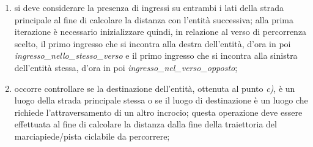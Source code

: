 \begin{enumerate}
\begin{enumerate}
\item si deve considerare la presenza di ingressi su entrambi i lati della strada principale al fine di calcolare la distanza con l'entità successiva; alla prima iterazione è necessario inizializzare quindi, in relazione al verso di percorrenza scelto, il primo ingresso che si incontra alla destra dell'entità, d'ora in poi \textit{ingres\-so\_nel\-lo\_stes\-so\_ver\-so} e il primo ingresso che si incontra alla sinistra dell'entità stessa, d'ora in poi \textit{ingres\-so\_nel\_ver\-so\_op\-pos\-to};   
\item occorre controllare se la destinazione dell'entità, ottenuta al punto \textit{c)}, è un luogo della strada principale stessa o se il luogo di destinazione è un luogo che richiede l'attraversamento di un altro incrocio; questa operazione deve essere effettuata al fine di calcolare la distanza dalla fine della traiettoria del marciapiede/pista ciclabile da percorrere;

\end{enumerate}
\end{enumerate}

